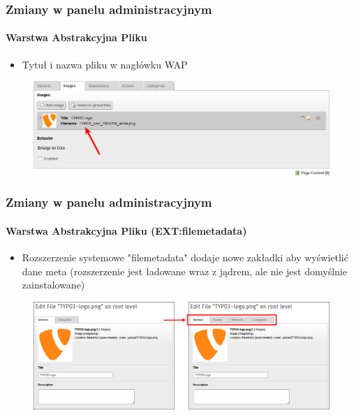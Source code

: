 
\begin{frame}[fragile]
	\frametitle{Zmiany w panelu administracyjnym}
	\framesubtitle{Warstwa Abstrakcyjna Pliku}

	\begin{itemize}
		\item Tytuł i nazwa pliku w nagłówku WAP
	\end{itemize}

	\begin{figure}
		\includegraphics[width=0.95\linewidth]{Images/BackendChanges/FalTitleAndFilename.png}
	\end{figure}

\end{frame}


\begin{frame}[fragile]
	\frametitle{Zmiany w panelu administracyjnym}
	\framesubtitle{Warstwa Abstrakcyjna Pliku (EXT:filemetadata)}

	\begin{itemize}
		\item Rozszerzenie systemowe "filemetadata" dodaje nowe zakładki aby wyświetlić dane meta\newline
			\small(rozszerzenie jest ładowane wraz z jądrem, ale nie jest domyślnie zainstalowane)\normalsize
	\end{itemize}

	\begin{figure}
		\includegraphics[width=0.8\linewidth]{Images/BackendChanges/FileMetaDataTabs.png}
	\end{figure}

\end{frame}


